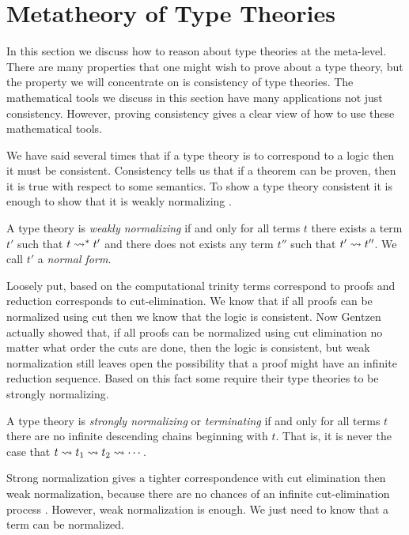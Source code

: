 \chapter{Metatheory of Type Theories}
\label{chap:metatheory_of_programming_languages}
In this section we discuss how to reason about type theories at the
meta-level.  There are many properties that one might wish to prove
about a type theory, but the property we will concentrate on is
consistency of type theories.  The mathematical tools we discuss in
this section have many applications not just consistency.  However,
proving consistency gives a clear view of how to use these
mathematical tools.

We have said several times that if a type theory is to correspond to a
logic then it must be consistent.  Consistency tells us that if a
theorem can be proven, then it is true with respect to some semantics.
To show a type theory consistent it is enough to show that it is
weakly normalizing \cite{Sorensen:2006}.
\begin{definition}
  \label{def:weak_norm}
  A type theory is \emph{weakly normalizing} if and only for all terms $t$
  there exists a term $t'$ such that $t \rightsquigarrow^* t'$ and there does
  not exists any term $t''$ such that $t' \rightsquigarrow t''$.  We
  call $t'$ a \emph{normal form}.
\end{definition}
\noindent
Loosely put, based on the computational trinity terms correspond to
proofs and reduction corresponds to cut-elimination.  We know that if
all proofs can be normalized using cut then we know that the logic is
consistent.  Now Gentzen actually showed that, if all proofs can be
normalized using cut elimination no matter what order the cuts are
done, then the logic is consistent, but weak normalization still
leaves open the possibility that a proof might have an infinite
reduction sequence. Based on this fact some require their type
theories to be strongly normalizing.
\begin{definition}
  \label{def:strong_norm}
  A type theory is \emph{strongly normalizing} or \emph{terminating}
  if and only for all terms $t$ there are no infinite descending
  chains beginning with $t$.  That is, it is never the case that $t
  \rightsquigarrow t_1 \rightsquigarrow t_2 \rightsquigarrow \cdots$.
\end{definition}
\noindent
Strong normalization gives a tighter correspondence with cut
elimination then weak normalization, because there are no chances of
an infinite cut-elimination process \cite{Sorensen:2006}.  However,
weak normalization is enough.  We just need to know that a term can be
normalized.

